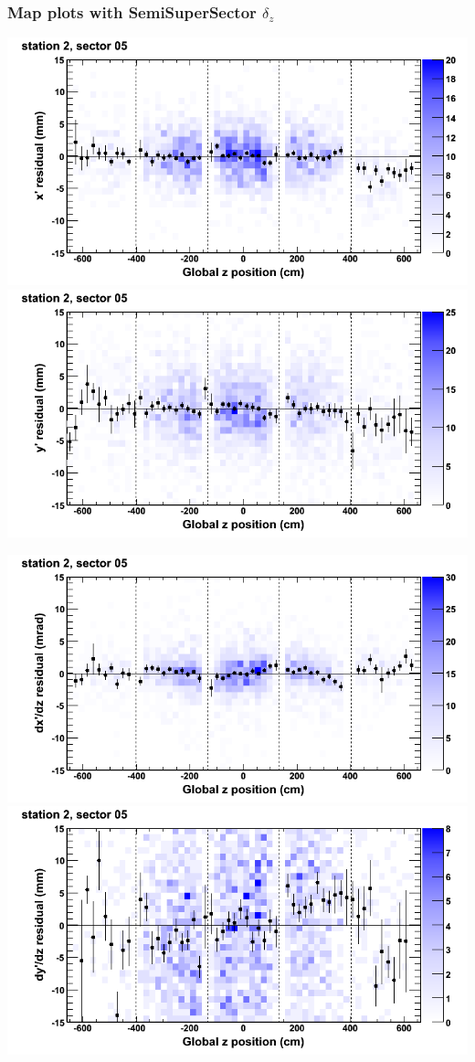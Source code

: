 \documentclass[compress]{beamer}
\begin{document}
\begin{frame}
\frametitle{Map plots with SemiSuperSector $\delta_z$}
\includegraphics[width=0.5\linewidth]{zfit_mapplots/DTvsz_st2sec05_x.png}
\includegraphics[width=0.5\linewidth]{zfit_mapplots/DTvsz_st2sec05_y.png}

\includegraphics[width=0.5\linewidth]{zfit_mapplots/DTvsz_st2sec05_dxdz.png}
\includegraphics[width=0.5\linewidth]{zfit_mapplots/DTvsz_st2sec05_dydz.png}
\end{frame}
\end{document}
